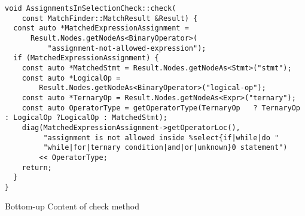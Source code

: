 \begin{listing}[H]
\begin{verbatim}
void AssignmentsInSelectionCheck::check(
    const MatchFinder::MatchResult &Result) {
  const auto *MatchedExpressionAssignment =
      Result.Nodes.getNodeAs<BinaryOperator>(
          "assignment-not-allowed-expression");
  if (MatchedExpressionAssignment) {
    const auto *MatchedStmt = Result.Nodes.getNodeAs<Stmt>("stmt");
    const auto *LogicalOp =
        Result.Nodes.getNodeAs<BinaryOperator>("logical-op");
    const auto *TernaryOp = Result.Nodes.getNodeAs<Expr>("ternary");
    const auto OperatorType = getOperatorType(TernaryOp   ? TernaryOp : LogicalOp ?LogicalOp : MatchedStmt);
    diag(MatchedExpressionAssignment->getOperatorLoc(),
         "assignment is not allowed inside %select{if|while|do "
         "while|for|ternary condition|and|or|unknown}0 statement")
        << OperatorType;
    return;
  }
}
\end{verbatim}
\caption{Bottom-up Content of check method }
\end{listing}